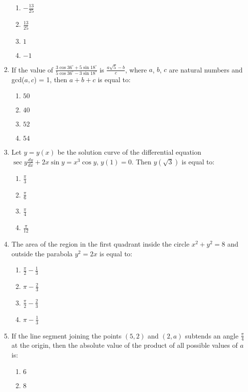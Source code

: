 \documentclass[journal,12pt,onecolumn]{IEEEtran}
\theoremstyle{remark}
\begin{document}
\begin{enumerate}
    \begin{enumerate}
        \item $-\frac{13}{25}$
        \item $\frac{13}{25}$
        \item $1$
        \item $-1$
    \end{enumerate}
    \item If the value of $\frac{3 \cos 36^\circ + 5 \sin 18^\circ}{5 \cos 36^\circ - 3 \sin 18^\circ}$ is $\frac{a \sqrt{5} - b}{c}$, where $a$, $b$, $c$ are natural numbers and gcd($a, c$) = 1, then $a + b + c$ is equal to:
    \begin{enumerate}
        \item $50$
        \item $40$
        \item $52$
        \item $54$
    \end{enumerate}
    \item Let $y = y(x)$ be the solution curve of the differential equation $\sec y \frac{dy}{dx} + 2x \sin y = x^3 \cos y$, $y(1) = 0$. Then $y(\sqrt{3})$ is equal to:
    \begin{enumerate}
        \item $\frac{\pi}{3}$
        \item $\frac{\pi}{6}$
        \item $\frac{\pi}{4}$
        \item $\frac{\pi}{12}$
    \end{enumerate}
    \item The area of the region in the first quadrant inside the circle $x^2 + y^2 = 8$ and outside the parabola $y^2 = 2x$ is equal to:
    \begin{enumerate}
        \item $\frac{\pi}{2} - \frac{1}{3}$
        \item $\pi - \frac{2}{3}$
        \item $\frac{\pi}{2} - \frac{2}{3}$
        \item $\pi - \frac{1}{3}$
    \end{enumerate}
    \item If the line segment joining the points $(5, 2)$ and $(2, a)$ subtends an angle $\frac{\pi}{4}$ at the origin, then the absolute value of the product of all possible values of $a$ is:
    \begin{enumerate}
        \item $6$
        \item $8$

\end{enumerate}
\end{enumerate}
\end{document}
